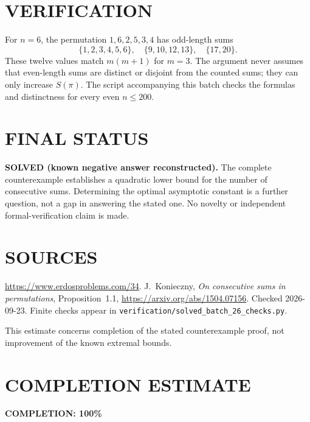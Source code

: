 \section{VERIFICATION}
For $n=6$, the permutation $1,6,2,5,3,4$ has odd-length sums
\[
 \{1,2,3,4,5,6\},\quad\{9,10,12,13\},\quad\{17,20\}.
\]
These twelve values match $m(m+1)$ for $m=3$. The argument never assumes
that even-length sums are distinct or disjoint from the counted sums;
they can only increase $S(\pi)$. The script accompanying this batch
checks the formulas and distinctness for every even $n\leq200$.

\section{FINAL STATUS}
\textbf{SOLVED (known negative answer reconstructed).}
The complete counterexample establishes a quadratic lower bound for
the number of consecutive sums. Determining the optimal asymptotic
constant is a further question, not a gap in answering the stated one.
No novelty or independent formal-verification claim is made.

\section{SOURCES}
\url{https://www.erdosproblems.com/34}.
J.~Konieczny, \emph{On consecutive sums in permutations},
Proposition~1.1, \url{https://arxiv.org/abs/1504.07156}.
Checked 2026-09-23. Finite checks appear in
\texttt{verification/solved\_batch\_26\_checks.py}.

This estimate concerns completion of the stated counterexample proof,
not improvement of the known extremal bounds.

\section{COMPLETION ESTIMATE}
\textbf{COMPLETION: 100\%}
